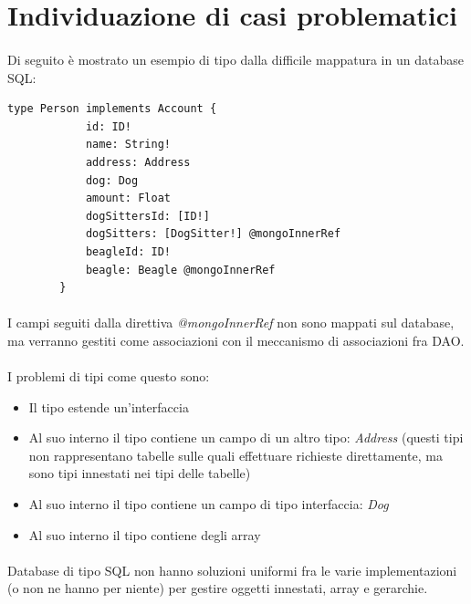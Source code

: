 \documentclass[a4paper, 12pt]{report}
\begin{document}
    \section{Individuazione di casi problematici}
    \paragraph*{}
    Di seguito è mostrato un esempio di tipo dalla difficile mappatura in un database SQL:
      \begin{Verbatim}[samepage=true]
        type Person implements Account {
            id: ID!
            name: String!
            address: Address
            dog: Dog
            amount: Float
            dogSittersId: [ID!]
            dogSitters: [DogSitter!] @mongoInnerRef
            beagleId: ID!
            beagle: Beagle @mongoInnerRef
        }
      \end{Verbatim}
      \paragraph*{}
      I campi seguiti dalla direttiva \emph{@mongoInnerRef} non sono mappati sul database, ma verranno gestiti come associazioni con il meccanismo di associazioni fra DAO.
      \paragraph*{}
      I problemi di tipi come questo sono:
      \begin{itemize}
        \item Il tipo estende un'interfaccia
        \item Al suo interno il tipo contiene un campo di un altro tipo: \emph{Address} (questi tipi non rappresentano tabelle sulle quali effettuare richieste direttamente, ma sono tipi innestati nei tipi delle tabelle)
        \item Al suo interno il tipo contiene un campo di tipo interfaccia: \emph{Dog}
        \item Al suo interno il tipo contiene degli array
      \end{itemize}
      \paragraph*{}
      Database di tipo SQL non hanno soluzioni uniformi fra le varie implementazioni (o non ne hanno per niente) per gestire oggetti innestati, array e gerarchie.
\end{document}
